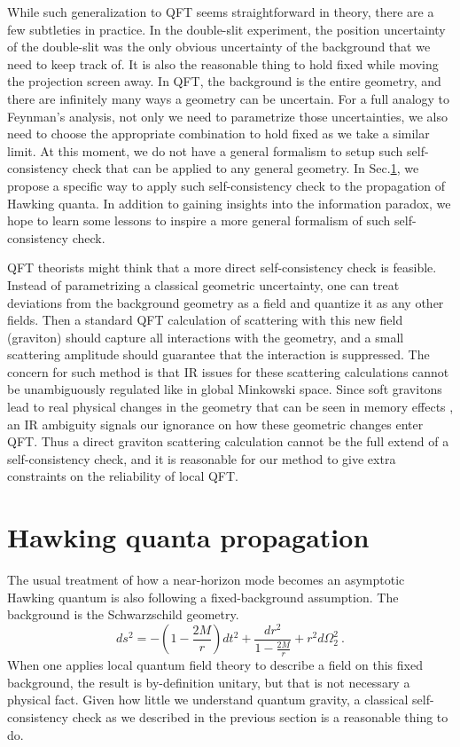\documentclass[aps,showpacs,twocolumn,floats,prd,superscriptaddress,nofootinbib]{revtex4-1}
\begin{document}
While such generalization to QFT seems straightforward in theory, there are a few subtleties in practice.
In the double-slit experiment, the position uncertainty of the double-slit was the only obvious uncertainty of the background that we need to keep track of.
It is also the reasonable thing to hold fixed while moving the projection screen away.
In QFT, the background is the entire geometry, and there are infinitely many ways a geometry can be uncertain.
For a full analogy to Feynman's analysis, not only we need to parametrize those uncertainties, we also need to choose the appropriate combination to hold fixed as we take a similar limit.
At this moment, we do not have a general formalism to setup such self-consistency check that can be applied to any general geometry. 
In Sec.\ref{sec-BlackHole}, we propose a specific way to apply such self-consistency check to the propagation of Hawking quanta.
In addition to gaining insights into the information paradox, we hope to learn some lessons to inspire a more general formalism of such self-consistency check.

QFT theorists might think that a more direct self-consistency check is feasible.
Instead of parametrizing a classical geometric uncertainty, one can treat deviations from the background geometry as a field and quantize it as any other fields.
Then a standard QFT calculation of scattering with this new field (graviton) should capture all interactions with the geometry, and a small scattering amplitude should guarantee that the interaction is suppressed. 
The concern for such method is that IR issues for these scattering calculations cannot be unambiguously regulated like in global Minkowski space.
Since soft gravitons lead to real physical changes in the geometry that can be seen in memory effects \cite{Wei65,HeLys14}, an IR ambiguity signals our ignorance on how these geometric changes enter QFT.
Thus a direct graviton scattering calculation cannot be the full extend of a self-consistency check, and it is reasonable for our method to give extra constraints on the reliability of local QFT.

\section{Hawking quanta propagation}
\label{sec-BlackHole}

The usual treatment of how a near-horizon mode becomes an asymptotic Hawking quantum is also following a fixed-background assumption.
The background is the Schwarzschild geometry.
\begin{equation}
ds^2 = -\left(1-\frac{2M}{r}\right)dt^2 + \frac{dr^2}{1-\frac{2M}{r}} + r^2d\Omega_2^2~.
\end{equation}
When one applies local quantum field theory to describe a field on this fixed background, the result is by-definition unitary, but that is not necessary a physical fact. 
Given how little we understand quantum gravity, a classical self-consistency check as we described in the previous section is a reasonable thing to do.
\end{document}
